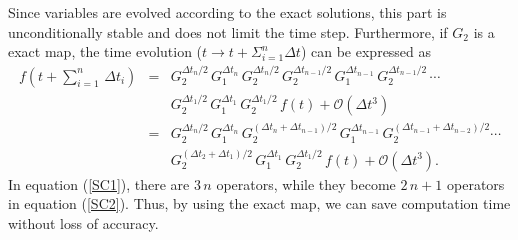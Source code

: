\documentclass[12pt,preprint]{aastex}
\begin{document}
Since variables are evolved according to the exact solutions, this part is unconditionally stable and does not limit the time step.
Furthermore, if $G_{2}$ is a exact map, 
the time evolution ($t \rightarrow t+\Sigma_{i=1}^{n}\Delta t$)
can be expressed as 
\begin{eqnarray}
f(t+\sum_{i=1}^{n}\,\Delta t_{i})&=&G_{2}^{\Delta t_{n}/2}\,G_{1}^{\Delta t_{n}}\,G_{2}^{\Delta t_{n}/2}\,
G_{2}^{\Delta t_{n-1}/2}\,G_{1}^{\Delta t_{n-1}}\,G_{2}^{\Delta t_{n-1}/2}\,\cdots\,\nonumber\\&&
G_{2}^{\Delta t_{1}/2}\,G_{1}^{\Delta t_{1}}\,G_{2}^{\Delta t_{1}/2}\,f(t)+\mathcal{O}(\Delta t^{3})\label{SC1}\\
&=& G_{2}^{\Delta t_{n}/2}\,G_{1}^{\Delta t_{n}}\,G_{2}^{(\Delta t_{n}+\Delta t_{n-1})/2}\,
G_{1}^{\Delta t_{n-1}}\,G_{2}^{(\Delta t_{n-1}+\Delta t_{n-2})/2}\cdots\nonumber\\&&
G_{2}^{(\Delta t_{2}+\Delta t_{1})/2}\,G_{1}^{\Delta t_{1}}\,G_{2}^{\Delta t_{1}/2}\,f(t)+\mathcal{O}(\Delta t^{3}).\label{SC2}
\end{eqnarray}
In equation (\ref{SC1}), there are $3\,n$ operators, while they become $2\,n+1$ operators in equation (\ref{SC2}).
Thus, by using the exact map, we can save computation time without loss of accuracy.
\end{document}
